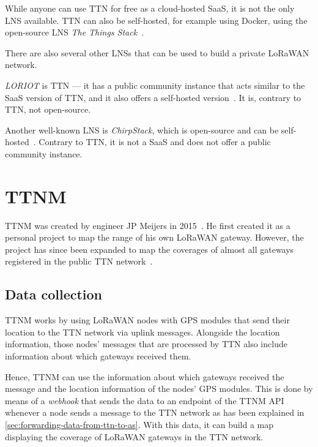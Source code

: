 While anyone can use \ac{TTN} for free as a cloud-hosted \ac{SaaS}, it is not the only \ac{LNS} available.
\ac{TTN} can also be self-hosted, for example using Docker, using the open-source \ac{LNS} \emph{The Things Stack}~\cite{the_things_network_host_2023}.

There are also several other \acp{LNS} that can be used to build a private \ac{LoRaWAN} network.

\emph{LORIOT} is \ac{TTN} --- it has a public community instance that acts similar to the \ac{SaaS} version of \ac{TTN}, and it also offers a self-hosted version~\cite{loriot_ag_loriot_2023}.
It is, contrary to \ac{TTN}, not open-source.

Another well-known \ac{LNS} is \emph{ChirpStack}, which is open-source and can be self-hosted~\cite{chirpstack_chirpstack_2023}.
Contrary to \ac{TTN}, it is not a \ac{SaaS} and does not offer a public community instance.

\section{\acf{TTNM}}

\acf{TTNM} was created by engineer JP Meijers in 2015~\cite{linkedin_23_nodate}.
He first created it as a personal project to map the range of his own \ac{LoRaWAN} gateway.
However, the project has since been expanded to map the coverages of almost all gateways registered in the public \ac{TTN} network~\cite{the_things_network_jp_2018}.

\subsection{Data collection}\label{sec:ttm-data-collection}

\acl{TTNM} works by using \ac{LoRaWAN} nodes with \ac{GPS} modules that send their location to the \ac{TTN} network via uplink messages.
Alongside the location information, those nodes' messages that are processed by \ac{TTN} also include information about which gateways received them.

Hence, \acl{TTNM} can use the information about which gateways received the message and the location information of the nodes' \ac{GPS} modules.
This is done by means of a \emph{webhook} that sends the data to an endpoint of the \acl{TTNM} \ac{API} whenever a node sends a message to the \ac{TTN} network as has been explained in \cref{sec:forwarding-data-from-ttn-to-as}.
With this data, it can build a map displaying the coverage of \ac{LoRaWAN} gateways in the \ac{TTN} network.

